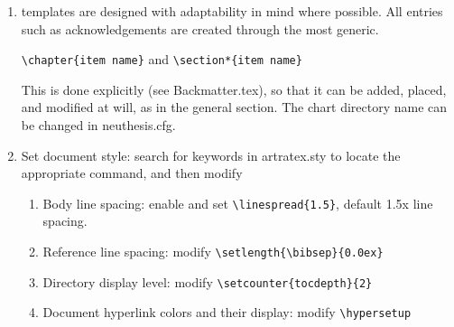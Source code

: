 \begin{enumerate}
    \item templates are designed with adaptability in mind where possible. All entries such as acknowledgements are created through the most generic.

        \verb+\chapter{item name}+  and \verb+\section*{item name}+

        This is done explicitly (see Backmatter.tex), so that it can be added, placed, and modified at will, as in the general section. The chart directory name can be changed in neuthesis.cfg.

    \item Set document style: search for keywords in artratex.sty to locate the appropriate command, and then modify
        \begin{enumerate}
            \item Body line spacing: enable and set \verb|\linespread{1.5}|, default 1.5x line spacing.
            \item Reference line spacing: modify \verb|\setlength{\bibsep}{0.0ex}|
            \item Directory display level: modify \verb|\setcounter{tocdepth}{2}|
            \item Document hyperlink colors and their display: modify \verb|\hypersetup|
        \end{enumerate}


\end{enumerate}
